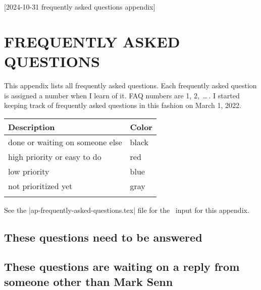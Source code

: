 [2024-10-31 frequently asked questions appendix]

\newcommand{\MyA}{\textbf{A: }}

\makeatletter
\newcommand{\faq}[2]
  {%
    \vspace{6pt}
    \noindent
    {%
      \bfseries
      \ifthen{\equal{high}{#2}}{\color{red}}%
      \ifthen{\equal{low}{#2}}{\color{blue}}%
      \ifthen{\equal{answered}{#2}}{\color{black}}%
      \ifthen{\equal{done}{#2}}{\color{black}}%
      \ifthen{\equal{fixed}{#2}}{\color{black}}%
      \ifthen{\equal{wait}{#2}}{\color{black}}%
      \ifthen{\equal{not}{#2}}{\color{gray}}%
      {\fontsize{9}{10}\reset@font\bf FAQ}
      #1.
    }%
    \ignorespaces
  }
\makeatother
  
\chapter{FREQUENTLY ASKED QUESTIONS}

This appendix lists all frequently asked questions.
Each frequently asked question is assigned a number when I learn of it.
FAQ numbers are 1, 2,~\ldots\,.
I started keeping track
of frequently asked questions
in this fashion
on March 1, 2022.

\begin{tabular}{@{}ll@{}}
  \toprule
  \bf Description& \bf Color\\
  \midrule
  done or waiting on someone else& \color{black}black\\
  high priority or easy to do& \color{red}red\\
  low priority& \color{blue}blue\\
  not prioritized yet& \color{gray}gray\\
  \bottomrule\\
\end{tabular}

See the
|ap-frequently-asked-questions.tex|
file
for the \LuaLaTeXLogo\ input
for this appendix.


\section{These questions need to be answered}


\section{These questions are waiting on a reply from someone other than Mark Senn}


